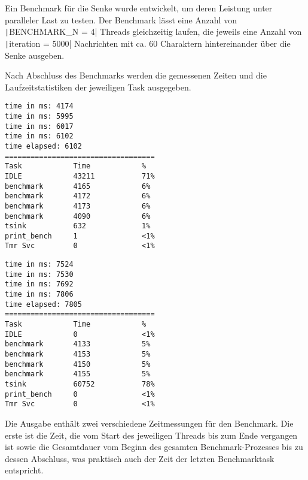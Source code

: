 Ein Benchmark für die Senke wurde entwickelt, um deren Leistung unter paralleler
Last zu testen. Der Benchmark lässt eine Anzahl von
\texttt|BENCHMARK_N = 4| Threads gleichzeitig laufen, die jeweils eine
Anzahl von \texttt|iteration = 5000| Nachrichten mit ca. 60 Charaktern
hintereinander über die Senke ausgeben.

Nach Abschluss des Benchmarks werden die gemessenen Zeiten und die
Laufzeitstatistiken der jeweiligen Task ausgegeben.

\begin{minipage}[t]{0.5\textwidth}
    \begin{code}
        \begin{verbatim}
time in ms: 4174
time in ms: 5995
time in ms: 6017
time in ms: 6102
time elapsed: 6102
===================================
Task            Time            %
IDLE            43211           71%
benchmark       4165            6%
benchmark       4172            6%
benchmark       4173            6%
benchmark       4090            6%
tsink           632             1%
print_bench     1               <1%
Tmr Svc         0               <1%
    \end{verbatim}
    \end{code}
\end{minipage}
\hfill
\begin{minipage}[t]{0.5\textwidth}
    \begin{code}
        \begin{verbatim}
time in ms: 7524
time in ms: 7530
time in ms: 7692
time in ms: 7806
time elapsed: 7805
===================================
Task            Time            %
IDLE            0               <1%
benchmark       4133            5%
benchmark       4153            5%
benchmark       4150            5%
benchmark       4155            5%
tsink           60752           78%
print_bench     0               <1%
Tmr Svc         0               <1%
    \end{verbatim}
    \end{code}
\end{minipage}

Die Ausgabe enthält zwei verschiedene Zeitmessungen für den Benchmark. Die erste
ist die Zeit, die vom Start des jeweiligen Threads bis zum Ende vergangen ist
sowie die Gesamtdauer vom Beginn des gesamten Benchmark-Prozesses bis zu dessen
Abschluss, was praktisch auch der Zeit der letzten Benchmarktask entspricht.

